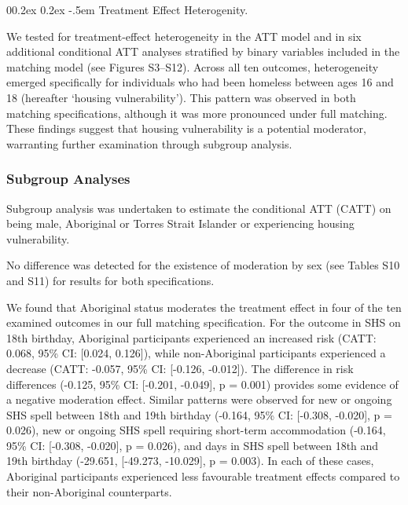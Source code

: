 \documentclass[
  jou,
  floatsintext,
  longtable,
  nolmodern,
  notxfonts,
  notimes,
  colorlinks=true,linkcolor=blue,citecolor=blue,urlcolor=blue]{apa7}
\makeatletter
\renewcommand{\paragraph}{\@startsection{paragraph}{4}{\parindent}%
	{0\baselineskip \@plus 0.2ex \@minus 0.2ex}%
	{-.5em}%
	{\normalfont\normalsize\bfseries\typesectitle}}
\makeatother
\begin{document}
\paragraph{Treatment Effect
Heterogenity.}\label{treatment-effect-heterogenity}

We tested for treatment-effect heterogeneity in the ATT model and in six
additional conditional ATT analyses stratified by binary variables
included in the matching model (see Figures S3--S12). Across all ten
outcomes, heterogeneity emerged specifically for individuals who had
been homeless between ages 16 and 18 (hereafter `housing
vulnerability'). This pattern was observed in both matching
specifications, although it was more pronounced under full matching.
These findings suggest that housing vulnerability is a potential
moderator, warranting further examination through subgroup analysis.

\subsubsection{Subgroup Analyses}\label{subgroup-analyses}

Subgroup analysis was undertaken to estimate the conditional ATT (CATT)
on being male, Aboriginal or Torres Strait Islander or experiencing
housing vulnerability.

No difference was detected for the existence of moderation by sex (see
Tables S10 and S11) for results for both specifications.

We found that Aboriginal status moderates the treatment effect in four
of the ten examined outcomes in our full matching specification. For the
outcome in SHS on 18th birthday, Aboriginal participants experienced an
increased risk (CATT: 0.068, 95\% CI: {[}0.024, 0.126{]}), while
non-Aboriginal participants experienced a decrease (CATT: -0.057, 95\%
CI: {[}-0.126, -0.012{]}). The difference in risk differences (-0.125,
95\% CI: {[}-0.201, -0.049{]}, p = 0.001) provides some evidence of a
negative moderation effect. Similar patterns were observed for new or
ongoing SHS spell between 18th and 19th birthday (-0.164, 95\% CI:
{[}-0.308, -0.020{]}, p = 0.026), new or ongoing SHS spell requiring
short-term accommodation (-0.164, 95\% CI: {[}-0.308, -0.020{]}, p =
0.026), and days in SHS spell between 18th and 19th birthday (-29.651,
{[}-49.273, -10.029{]}, p = 0.003). In each of these cases, Aboriginal
participants experienced less favourable treatment effects compared to
their non-Aboriginal counterparts.
\end{document}
